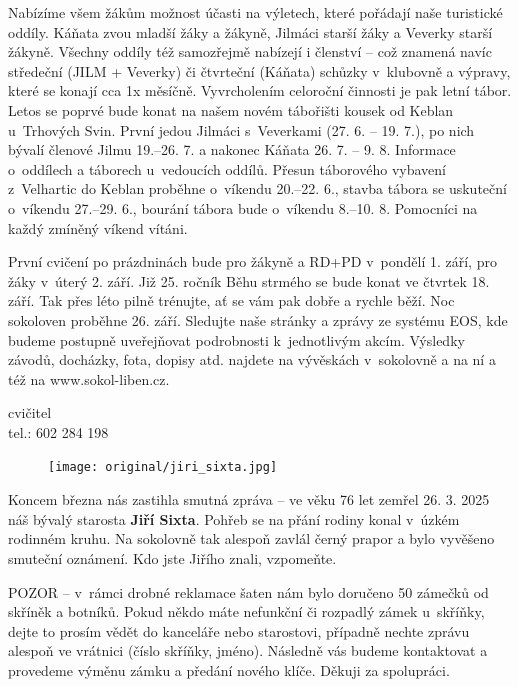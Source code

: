 \documentclass[11pt]{article}
\begin{document}
Nabízíme všem žákům možnost účasti na výletech, které pořádají naše
turistické oddíly. Káňata zvou mladší žáky a žákyně, Jilmáci starší žáky
a
Veverky starší žákyně. Všechny oddíly též samozřejmě nabízejí i členství
--
což znamená navíc středeční (JILM + Veverky) či čtvrteční (Káňata)
schůzky
v~klubovně a výpravy, které se konají cca 1x měsíčně.
Vyvrcholením celoroční činnosti je pak letní tábor. Letos se poprvé bude
konat na našem novém tábořišti kousek od Keblan u~Trhových Svin. První
jedou Jilmáci s~Veverkami (27. 6. -- 19. 7.), po nich bývalí členové
Jilmu 19.--26. 7. a nakonec Káňata 26. 7. -- 9. 8. Informace o~oddílech
a táborech
u~vedoucích oddílů.
Přesun táborového vybavení z~Velhartic do Keblan proběhne o~víkendu
20.--22. 6., stavba tábora se uskuteční o~víkendu 27.--29. 6., bourání
tábora bude
o~víkendu 8.--10. 8. Pomocníci na každý zmíněný víkend vítáni.

První cvičení po prázdninách bude pro žákyně a RD+PD v~pondělí 1. září,
pro žáky v~úterý 2. září.
Již 25. ročník Běhu strmého se bude konat ve čtvrtek 18. září.
Tak přes
léto pilně trénujte, ať se vám pak dobře a rychle běží.
Noc sokoloven proběhne 26. září.
Sledujte naše stránky a zprávy ze systému EOS, kde budeme postupně
uveřejňovat podrobnosti k~jednotlivým akcím.
Výsledky závodů, docházky, fota, dopisy atd. najdete na vývěskách
v~sokolovně a na ní a též na www.sokol-liben.cz.

\signature{Jiří Novák (Jirkan)}{cvičitel\\tel.: 602 284 198}

\vspace*{24pt}


\setlength{\intextsep}{0pt}%
\setlength{\columnsep}{12pt}%
\begin{figure}
\texttt{[image: original/jiri\_sixta.jpg]}
\end{figure}

Koncem března nás zastihla smutná zpráva -- ve věku 76 let zemřel 26. 3.
2025
náš bývalý starosta \textbf{Jiří Sixta}. Pohřeb se na přání rodiny konal
v~úzkém
rodinném kruhu. Na sokolovně tak alespoň zavlál černý prapor a bylo
vyvěšeno smuteční oznámení. Kdo jste Jiřího znali, vzpomeňte.

POZOR -- v~rámci drobné reklamace šaten nám bylo doručeno 50 zámečků od
skříněk a botníků. Pokud někdo máte nefunkční či rozpadlý zámek
u~skříňky, dejte
to prosím vědět do kanceláře nebo starostovi, případně nechte zprávu
alespoň ve
vrátnici (číslo skříňky, jméno). Následně vás budeme kontaktovat a
provedeme
výměnu zámku a předání nového klíče. Děkuji za spolupráci.
\end{document}

